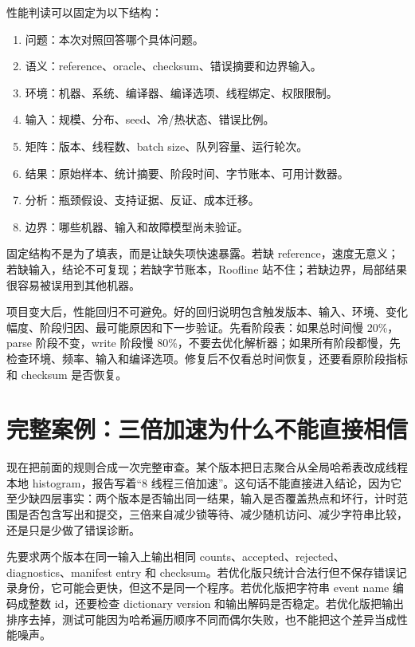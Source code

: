 性能判读可以固定为以下结构：

\begin{enumerate}
  \item 问题：本次对照回答哪个具体问题。
  \item 语义：reference、oracle、checksum、错误摘要和边界输入。
  \item 环境：机器、系统、编译器、编译选项、线程绑定、权限限制。
  \item 输入：规模、分布、seed、冷/热状态、错误比例。
  \item 矩阵：版本、线程数、batch size、队列容量、运行轮次。
  \item 结果：原始样本、统计摘要、阶段时间、字节账本、可用计数器。
  \item 分析：瓶颈假设、支持证据、反证、成本迁移。
  \item 边界：哪些机器、输入和故障模型尚未验证。
\end{enumerate}

固定结构不是为了填表，而是让缺失项快速暴露。若缺 reference，速度无意义；若缺输入，结论不可复现；若缺字节账本，Roofline 站不住；若缺边界，局部结果很容易被误用到其他机器。

项目变大后，性能回归不可避免。好的回归说明包含触发版本、输入、环境、变化幅度、阶段归因、最可能原因和下一步验证。先看阶段表：如果总时间慢 20\%，parse 阶段不变，write 阶段慢 80\%，不要去优化解析器；如果所有阶段都慢，先检查环境、频率、输入和编译选项。修复后不仅看总时间恢复，还要看原阶段指标和 checksum 是否恢复。

\section{完整案例：三倍加速为什么不能直接相信}

现在把前面的规则合成一次完整审查。某个版本把日志聚合从全局哈希表改成线程本地 histogram，报告写着“8 线程三倍加速”。这句话不能直接进入结论，因为它至少缺四层事实：两个版本是否输出同一结果，输入是否覆盖热点和坏行，计时范围是否包含写出和提交，三倍来自减少锁等待、减少随机访问、减少字符串比较，还是只是少做了错误诊断。

先要求两个版本在同一输入上输出相同 counts、accepted、rejected、diagnostics、manifest entry 和 checksum。若优化版只统计合法行但不保存错误记录身份，它可能会更快，但这不是同一个程序。若优化版把字符串 event name 编码成整数 id，还要检查 dictionary version 和输出解码是否稳定。若优化版把输出排序去掉，测试可能因为哈希遍历顺序不同而偶尔失败，也不能把这个差异当成性能噪声。

